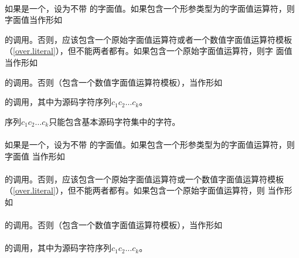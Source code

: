 \paragraph{} %
如果是一个，设为不带
的字面值。如果包含一个形参类型为的字面值运算符，则
字面值当作形如
\begin{codeenv}
\end{codeenv}
的调用。否则，应该包含一个原始字面值运算符或者一个数值字面值运算符模板
（\ref{over.literal}），但不能两者都有。如果包含一个原始字面值运算符，则字
面值当作形如
\begin{codeenv}
\end{codeenv}
的调用。否则（包含一个数值字面值运算符模板），当作形如
\begin{codeenv}
\end{codeenv}
的调用，其中为源码字符序列$c_1c_2\ldots c_k$。

\begin{note} %
  序列$c_1c_2\ldots c_k$只能包含基本源码字符集中的字符。
\end{note}

\paragraph{} %
如果是一个，设为不带
的字面值。如果包含一个形参类型为的字面值运算符，则字面值
当作形如                                                                \\
\mbox{\qquad {}}                                \\
的调用。否则，应该包含一个原始字面值运算符或一个数值字面值运算符模板
（\ref{over.literal}），但不能两者都有。如果包含一个原始字面值运算符，则
 当作形如                                                    \\
\mbox{\qquad {}}                               \\
的调用。否则（包含一个数值字面值运算符模板），当作形如            \\
\mbox{\qquad {}}                                                       \\
的调用，其中为源码字符序列$c_1c_2 \ldots c_k$。

